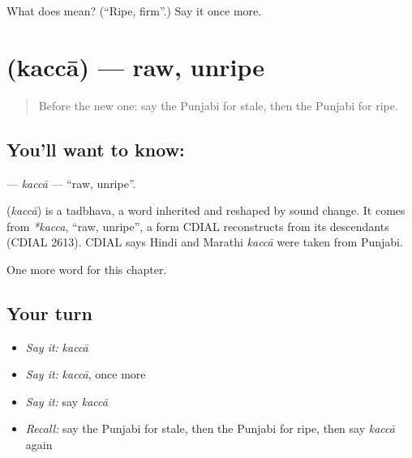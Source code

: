 \begin{tcolorbox}[breakable,colback=teal!4,colframe=teal!35!black,title={Before you move on}]
What does  mean? (\textquotedblleft{}Ripe, firm\textquotedblright{}.) Say it once more.
\end{tcolorbox}
\section[\texorpdfstring{\pa{ਕੱਚਾ} (kaccā)}{ਕੱਚਾ (kaccā)}]{ (kaccā) — raw, unripe}

\label{lesson:PA-C146-kacca}



\begin{quote}
Before the new one: say the Punjabi for stale, then the Punjabi for ripe.
\end{quote}

\subsection*{You'll want to know: }
\textbf{} — \emph{kaccā} — \textquotedblleft{}raw, unripe\textquotedblright{}.

\begin{cousinweb}
\textbf{} (\emph{kaccā}) is a tadbhava, a word inherited and reshaped by sound change. It comes from \emph{*kacca}, \textquotedblleft{}raw, unripe\textquotedblright{}, a form CDIAL reconstructs from its descendants (CDIAL 2613). CDIAL says Hindi and Marathi \emph{kaccā} were taken from Punjabi.
\end{cousinweb}

\begin{grammarlens}[title={What you've built}]
One more word for this chapter.
\end{grammarlens}

\subsection*{Your turn}
\begin{itemize}
\raggedright
  \item \emph{Say it:} \emph{kaccā}
  \item \emph{Say it:} \emph{kaccā}, once more
  \item \emph{Say it:} say \emph{kaccā}
  \item \emph{Recall:} say the Punjabi for stale, then the Punjabi for ripe, then say \emph{kaccā} again
\end{itemize}

